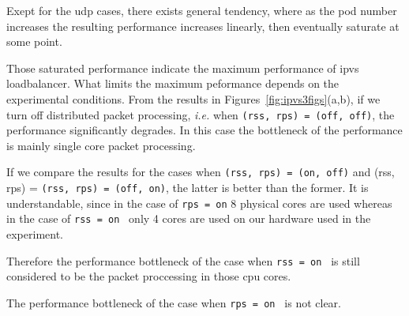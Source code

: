 Exept for the udp cases, there exists general tendency, 
where as the pod number increases the resulting performance increases linearly, 
then eventually saturate at some point.

Those saturated performance indicate the maximum performance of ipvs loadbalancer.
What limits the maximum peformance depends on the experimental conditions.
From the results in Figures~\ref{fig:ipvs3figs}(a,b), if we turn off distributed packet processing,
{\it i.e.} when {\tt (rss, rps) = (off, off)}, the performance significantly degrades. 
In this case the bottleneck of the performance is mainly single core packet processing.

If we compare the results for the cases when {\tt (rss, rps) = (on, off)} and (rss, rps) = {\tt (rss, rps) = (off, on)},
the latter is better than the former.
It is understandable, since in the case of {\tt rps = on} 8 physical cores are used whereas 
in the case of {\tt rss = on } only 4 cores are used on our hardware used in the experiment.

Therefore the performance bottleneck of the case when {\tt rss = on } is still 
considered to be the packet proccessing in those cpu cores.

The performance bottleneck of the case when {\tt rps = on } is not clear.



